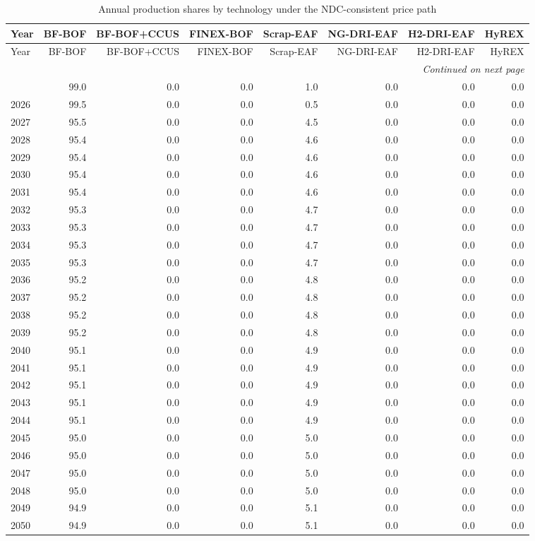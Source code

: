 \begin{longtable}{@{}lrrrrrrr@{}}
\caption{Annual production shares by technology under the NDC-consistent price path}
\label{tab:annual-shares-ngfs_ndcs} \\
\toprule
Year & BF-BOF & BF-BOF+CCUS & FINEX-BOF & Scrap-EAF & NG-DRI-EAF & H2-DRI-EAF & HyREX \\
\midrule
\endfirsthead
\toprule
Year & BF-BOF & BF-BOF+CCUS & FINEX-BOF & Scrap-EAF & NG-DRI-EAF & H2-DRI-EAF & HyREX \\
\midrule
\endhead
\bottomrule \multicolumn{8}{r}{\textit{Continued on next page}} \\
\endfoot
\bottomrule
\endlastfoot
2025 & 99.0 & 0.0 & 0.0 & 1.0 & 0.0 & 0.0 & 0.0 \\
2026 & 99.5 & 0.0 & 0.0 & 0.5 & 0.0 & 0.0 & 0.0 \\
2027 & 95.5 & 0.0 & 0.0 & 4.5 & 0.0 & 0.0 & 0.0 \\
2028 & 95.4 & 0.0 & 0.0 & 4.6 & 0.0 & 0.0 & 0.0 \\
2029 & 95.4 & 0.0 & 0.0 & 4.6 & 0.0 & 0.0 & 0.0 \\
2030 & 95.4 & 0.0 & 0.0 & 4.6 & 0.0 & 0.0 & 0.0 \\
2031 & 95.4 & 0.0 & 0.0 & 4.6 & 0.0 & 0.0 & 0.0 \\
2032 & 95.3 & 0.0 & 0.0 & 4.7 & 0.0 & 0.0 & 0.0 \\
2033 & 95.3 & 0.0 & 0.0 & 4.7 & 0.0 & 0.0 & 0.0 \\
2034 & 95.3 & 0.0 & 0.0 & 4.7 & 0.0 & 0.0 & 0.0 \\
2035 & 95.3 & 0.0 & 0.0 & 4.7 & 0.0 & 0.0 & 0.0 \\
2036 & 95.2 & 0.0 & 0.0 & 4.8 & 0.0 & 0.0 & 0.0 \\
2037 & 95.2 & 0.0 & 0.0 & 4.8 & 0.0 & 0.0 & 0.0 \\
2038 & 95.2 & 0.0 & 0.0 & 4.8 & 0.0 & 0.0 & 0.0 \\
2039 & 95.2 & 0.0 & 0.0 & 4.8 & 0.0 & 0.0 & 0.0 \\
2040 & 95.1 & 0.0 & 0.0 & 4.9 & 0.0 & 0.0 & 0.0 \\
2041 & 95.1 & 0.0 & 0.0 & 4.9 & 0.0 & 0.0 & 0.0 \\
2042 & 95.1 & 0.0 & 0.0 & 4.9 & 0.0 & 0.0 & 0.0 \\
2043 & 95.1 & 0.0 & 0.0 & 4.9 & 0.0 & 0.0 & 0.0 \\
2044 & 95.1 & 0.0 & 0.0 & 4.9 & 0.0 & 0.0 & 0.0 \\
2045 & 95.0 & 0.0 & 0.0 & 5.0 & 0.0 & 0.0 & 0.0 \\
2046 & 95.0 & 0.0 & 0.0 & 5.0 & 0.0 & 0.0 & 0.0 \\
2047 & 95.0 & 0.0 & 0.0 & 5.0 & 0.0 & 0.0 & 0.0 \\
2048 & 95.0 & 0.0 & 0.0 & 5.0 & 0.0 & 0.0 & 0.0 \\
2049 & 94.9 & 0.0 & 0.0 & 5.1 & 0.0 & 0.0 & 0.0 \\
2050 & 94.9 & 0.0 & 0.0 & 5.1 & 0.0 & 0.0 & 0.0 \\
\end{longtable}
